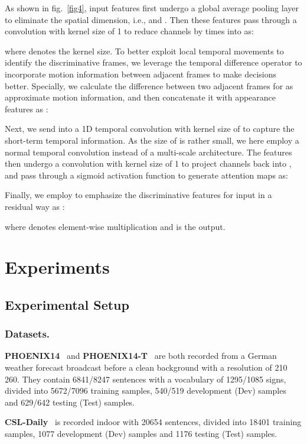 \documentclass[letterpaper]{article} \usepackage{aaai23}  \usepackage{times}  \usepackage{helvet}  \usepackage{courier}  \usepackage[hyphens]{url}  \usepackage{graphicx} \urlstyle{rm} \def\UrlFont{\rm}  \usepackage{natbib}  \usepackage{caption} \frenchspacing  \setlength{\pdfpagewidth}{8.5in} \setlength{\pdfpageheight}{11in} \usepackage{algorithm}
\begin{document}
As shown in fig.~\ref{fig4}, input features  first undergo a global average pooling layer to eliminate the spatial dimension, i.e.,  and . Then these features pass through a convolution with kernel size of 1 to reduce channels by  times into  as:

where  denotes the kernel size. To better exploit local temporal movements to identify the discriminative frames, we leverage the temporal difference operator to incorporate motion information between adjacent frames to make decisions better. Specially, we calculate the difference between two adjacent frames for  as approximate motion information, and then concatenate it with appearance features  as : 

Next, we send  into a 1D temporal convolution with kernel size of  to capture the short-term temporal information. As the size of  is rather small, we here employ a normal temporal convolution instead of a multi-scale architecture. The features then undergo a convolution with kernel size of 1 to project channels back into , and pass through a sigmoid activation function to generate attention maps  as:


Finally, we employ  to emphasize the discriminative features for input  in a residual way as :

where  denotes element-wise multiplication and  is the output.



\section{Experiments}
\subsection{Experimental Setup}
\subsubsection{Datasets.} \textbf{PHOENIX14}~\cite{koller2015continuous} and \textbf{PHOENIX14-T}~\cite{camgoz2018neural} are both recorded from a German weather forecast broadcast before a clean background with a resolution of 210  260. They contain 6841/8247 sentences with a vocabulary of 1295/1085 signs, divided into 5672/7096 training samples, 540/519 development (Dev) samples and 629/642 testing (Test) samples.

\textbf{CSL-Daily}~\cite{zhou2021improving} is recorded indoor with 20654 sentences, divided into 18401 training samples, 1077 development (Dev) samples and 1176 testing (Test) samples. 
\end{document}
